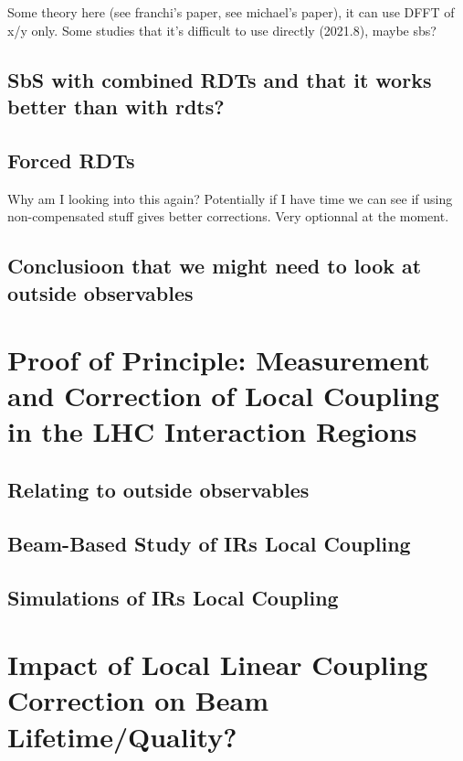 Some theory here (see franchi's paper, see michael's paper), it can use DFFT of x/y only.
Some studies that it's difficult to use directly (2021.8), maybe sbs?

\subsection{SbS with combined RDTs and that it works better than with rdts?}

\subsection{Forced RDTs}

Why am I looking into this again?
Potentially if I have time we can see if using non-compensated stuff gives better corrections.
Very optionnal at the moment.

\subsection{Conclusioon that we might need to look at outside observables}


\section{Proof of Principle: Measurement and Correction of Local Coupling in the LHC Interaction Regions}

\subsection{Relating to outside observables}

\subsection{Beam-Based Study of IRs Local Coupling}

\subsection{Simulations of IRs Local Coupling}


\section{Impact of Local Linear Coupling Correction on Beam Lifetime/Quality?}

